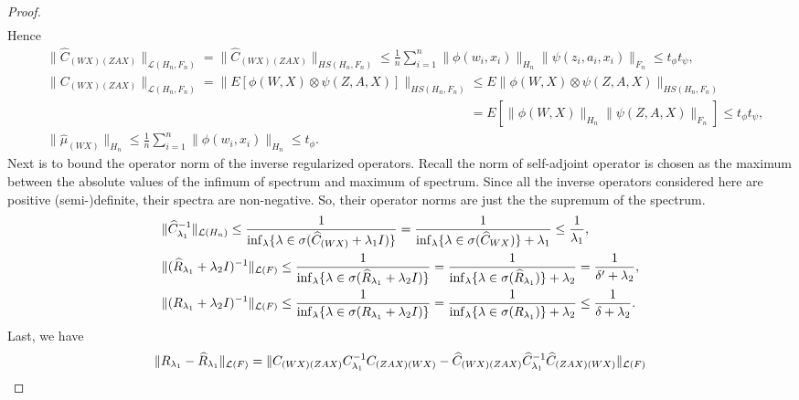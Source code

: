 \begin{proof}
\begin{align*}
    \end{align*}
    Hence 
    \begin{align*}
        &\|\widehat{C}_{(WX)(ZAX)}\|_{\mathcal{L}(H_n,F_n)}=\|\widehat{C}_{(WX)(ZAX)}\|_{HS(H_n,F_n)} \leq \frac{1}{n}\sum_{i=1}^n\|\phi(w_i,x_i)\|_{H_n}\|\psi(z_i,a_i,x_i)\|_{F_n} \leq t_{\phi}t_{\psi}, \\
        &\|C_{(WX)(ZAX)}\|_{\mathcal{L}(H_n,F_n)}=\|E[\phi(W,X)\otimes\psi(Z,A,X)]\|_{HS(H_n,F_n)} \leq E\|\phi(W,X)\otimes\psi(Z,A,X)\|_{HS(H_n,F_n)} \\
        &\phantom{\|C_{(WX)(ZAX)}\|_{\mathcal{L}(H_n,F_n)}=\|E[\phi(W,X)\otimes\psi(Z,A,X)]\|_{HS(H_n,F_n)}} = E\left[\|\phi(W,X)\|_{H_n}\|\psi(Z,A,X)\|_{F_n}\right] \leq t_{\phi}t_{\psi}, \\
        &\|\widehat{\mu}_{(WX)}\|_{H_n}\leq \frac{1}{n}\sum_{i=1}^{n}\|\phi(w_i,x_i)\|_{H_n}\leq t_{\phi}. 
    \end{align*}
    Next is to bound the operator norm of the inverse regularized operators.  
    Recall the norm of self-adjoint operator is chosen as the maximum between the absolute values of the infimum of spectrum and maximum of spectrum\cite{Neervan2022functional}. 
    Since all the inverse operators considered here are positive (semi-)definite, 
    their spectra are non-negative. 
    So, their operator norms are just the the supremum of the spectrum. 
    \begin{align}
        \label{eq: est_consistency2}
        &\|\widehat{C}_{\lambda_1}^{-1}\|_{\mathcal{L}(H_n)} \leq \frac{1}{\inf_{\lambda}\{\lambda\in\sigma(\widehat{C}_{(WX)}+\lambda_1I)\}} = \frac{1}{\inf_{\lambda}\{\lambda\in\sigma(\widehat{C}_{WX})\}+\lambda_1} \leq \frac{1}{\lambda_1}, \notag\\
        &\|(\widehat{R}_{\lambda_1}+\lambda_2I)^{-1}\|_{\mathcal{L}(F)} \leq \frac{1}{\inf_{\lambda}\{\lambda\in\sigma(\widehat{R}_{\lambda_1}+\lambda_2I)\}} = \frac{1}{\inf_{\lambda}\{\lambda\in\sigma(\widehat{R}_{\lambda_1})\}+\lambda_2} = \frac{1}{\delta'+\lambda_2}, \notag\\
        &\|(R_{\lambda_1}+\lambda_2I)^{-1}\|_{\mathcal{L}(F)} \leq \frac{1}{\inf_{\lambda}\{\lambda\in\sigma(R_{\lambda_1}+\lambda_2I)\}} = \frac{1}{\inf_{\lambda}\{\lambda\in\sigma(R_{\lambda_1})\}+\lambda_2} \leq \frac{1}{\delta+\lambda_2}. 
    \end{align}
    Last, we have 
    \begin{align}
        \label{eq: est_consistency3}
        \|R_{\lambda_1}-\widehat{R}_{\lambda_1}\|_{\mathcal{L}(F)} &= \|C_{(WX)(ZAX)}C_{\lambda_1}^{-1}C_{(ZAX)(WX)}-\widehat{C}_{(WX)(ZAX)}\widehat{C}_{\lambda_1}^{-1}\widehat{C}_{(ZAX)(WX)}\|_{\mathcal{L}(F)} \notag\\

\end{align}
\end{proof}
